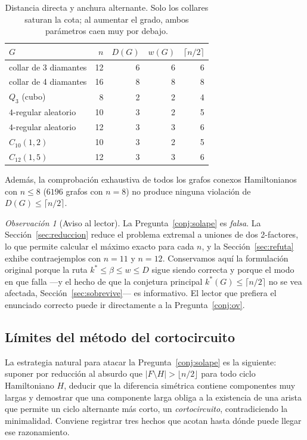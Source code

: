 \documentclass[11pt,a4paper]{article}
\theoremstyle{definition}
\theoremstyle{remark}
\newtheorem{observacion}[teorema]{Observación}
\begin{document}
\begin{table}[h]
\centering
\begin{tabular}{lrrrr}
\toprule
$G$ & $n$ & $D(G)$ & $w(G)$ & $\lceil n/2\rceil$\\
\midrule
collar de 3 diamantes & 12 & 6 & 6 & 6\\
collar de 4 diamantes & 16 & 8 & 8 & 8\\
$Q_3$ (cubo) & 8 & 2 & 2 & 4\\
$4$-regular aleatorio & 10 & 3 & 2 & 5\\
$4$-regular aleatorio & 12 & 3 & 3 & 6\\
$C_{10}(1,2)$ & 10 & 3 & 2 & 5\\
$C_{12}(1,5)$ & 12 & 3 & 3 & 6\\
\bottomrule
\end{tabular}
\caption{Distancia directa y anchura alternante. Solo los collares saturan la cota; al aumentar el grado, ambos parámetros caen muy por debajo.}\label{tab:DW}
\end{table}

Además, la comprobación exhaustiva de todos los grafos conexos Hamiltonianos con $n\le8$ ($6196$ grafos con $n=8$) no produce ninguna violación de $D(G)\le\lceil n/2\rceil$.

\begin{observacion}[Aviso al lector]\label{obs:aviso}
La Pregunta~\ref{conj:solape} es \emph{falsa}. La Sección~\ref{sec:reduccion} reduce el problema extremal a uniones de dos 2-factores, lo que permite calcular el máximo exacto para cada $n$, y la Sección~\ref{sec:refuta} exhibe contraejemplos con $n=11$ y $n=12$. Conservamos aquí la formulación original porque la ruta $k^*\le\beta\le w\le D$ sigue siendo correcta y porque el modo en que falla —y el hecho de que la conjetura principal $k^*(G)\le\lceil n/2\rceil$ no se vea afectada, Sección~\ref{sec:sobrevive}— es informativo. El lector que prefiera el enunciado correcto puede ir directamente a la Pregunta~\ref{conj:ov}.
\end{observacion}


\subsection{Límites del método del cortocircuito}\label{sub:cortocircuito}

La estrategia natural para atacar la Pregunta~\ref{conj:solape} es la siguiente: suponer por reducción al absurdo que $|F\setminus H|>\lfloor n/2\rfloor$ para todo ciclo Hamiltoniano $H$, deducir que la diferencia simétrica contiene componentes muy largas y demostrar que una componente larga obliga a la existencia de una arista que permite un ciclo alternante más corto, un \emph{cortocircuito}, contradiciendo la minimalidad. Conviene registrar tres hechos que acotan hasta dónde puede llegar ese razonamiento.
\end{document}
